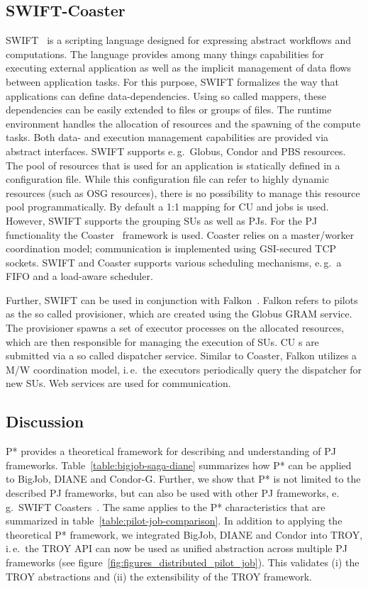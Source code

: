 \documentclass[conference,final]{IEEEtran}
\newcommand{\cu}{CU\xspace}
\newcommand{\upp}{\vspace*{-0.5em}}
\begin{document}
\upp
\subsection{SWIFT-Coaster\upp\upp}

SWIFT~\cite{Wilde2011} is a scripting language designed for expressing abstract
workflows and computations. The language provides among many things capabilities
for executing external application as well as the implicit management of data
flows between application tasks. For this purpose, SWIFT formalizes the way that
applications can define data-dependencies. Using so called mappers, these
dependencies can be easily extended to files or groups of files. The runtime
environment handles the allocation of resources and the spawning of the compute
tasks. Both data- and execution management capabilities are provided via
abstract interfaces. SWIFT supports e.\,g.\ Globus, Condor and PBS resources.
The pool of resources that is used for an application is statically defined in a
configuration file. While this configuration file can refer to highly dynamic
resources (such as OSG resources), there is no possibility to manage this
resource pool programmatically. By default a 1:1 mapping for \cu and jobs is
used. However, SWIFT supports the grouping SUs as well as PJs. For the PJ
functionality the Coaster~\cite{coasters} framework is used. Coaster relies on a
master/worker coordination model; communication is implemented using GSI-secured
TCP sockets. SWIFT and Coaster supports various scheduling mechanisms, e.\,g.\ 
a FIFO and a load-aware scheduler. 

Further, SWIFT can be used in conjunction with Falkon~\cite{1362680}. Falkon
refers to pilots as the so called provisioner, which are created using the
Globus GRAM service. The provisioner spawns a set of executor processes on the
allocated resources, which are then responsible for managing the execution of
SUs. \cu s are submitted via a so called dispatcher service. Similar to Coaster,
Falkon utilizes a M/W coordination model, i.\,e.\ the executors periodically
query the dispatcher for new SUs. Web services are used for communication.


\subsection{Discussion}



P* provides a theoretical framework for describing and understanding of PJ
frameworks. Table~\ref{table:bigjob-saga-diane} summarizes how P* can be applied
to BigJob, DIANE and Condor-G. Further, we show that P* is not limited to the
described PJ frameworks, but can also be used with other PJ frameworks, e.\,g.\
SWIFT Coasters~\cite{coasters}. The same applies to the P* characteristics 
that
are summarized in table~\ref{table:pilot-job-comparison}. In addition to
applying the theoretical P* framework, we integrated BigJob, DIANE and Condor
into TROY, i.\,e.\ the TROY API can now be used as unified abstraction across
multiple PJ frameworks (see figure~\ref{fig:figures_distributed_pilot_job}).
This validates (i) the TROY abstractions and (ii) the extensibility of the TROY
framework.
\end{document}
